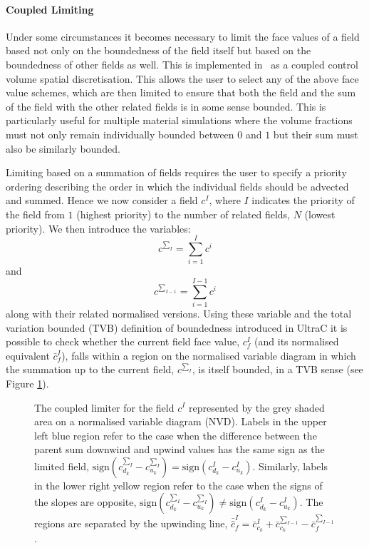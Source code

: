 \paragraph{Coupled Limiting} \label{sec:coupledlimiter}

Under some circumstances it becomes necessary to limit the face values of a field based not only on the boundedness of the field itself but based on the boundedness of other fields as well.  This is implemented in \fluidity\ as a coupled control volume spatial discretisation.  This allows the user to select any of the above face value schemes, which are then limited to ensure that both the field and the sum of the field with the other related fields is in some sense bounded.  This is particularly useful for multiple material simulations where the volume fractions must not only remain individually bounded between $0$ and $1$ but their sum must also be similarly bounded.

Limiting based on a summation of fields requires the user to specify a priority ordering describing the order in which the individual fields should be advected and summed.  Hence we now consider a field $c^I$, where $I$ indicates the priority of the field from $1$ (highest priority) to the number of related fields, $N$ (lowest priority).  We then introduce the variables:
\begin{equation}
c^{\sum_{I}} = \sum_{i=1}^I c^i
\end{equation}
and
\begin{equation}
c^{\sum_{I-1}} = \sum_{i=1}^{I-1} c^i
\end{equation}
along with their related normalised versions.  Using these variable and the total variation bounded (TVB) definition of boundedness introduced in UltraC it is possible to check whether the current field face value, $c_{f}^I$ (and its normalised equivalent $\bar{c}_{f}^I$), falls within a region on the normalised variable diagram in which the summation up to the current field, $c^{\sum_{I}}$, is itself bounded, in a TVB sense (see Figure \ref{fig:coupledlimiter}).

\begin{figure}[tbp]
\begin{center}
\caption{The coupled limiter for the field $c^I$ represented by the grey shaded area on a normalised variable diagram (NVD).  Labels in the upper left blue region refer to the case when the difference between the parent sum downwind and upwind values has the same sign as the limited field, $\text{sign}\left(c^{\sum_{I}}_{d_k}-c^{\sum_{I}}_{u_k}\right) = \text{sign}\left(c^{I}_{d_k}-c^{I}_{u_k}\right)$.  Similarly, labels in the lower right yellow region refer to the case when the signs of the slopes are opposite, $\text{sign}\left(c^{\sum_{I}}_{d_k}-c^{\sum_{I}}_{u_k}\right) \neq \text{sign}\left(c^{I}_{d_k}-c^{I}_{u_k}\right)$. The regions are separated by the upwinding line, $\bar{\hat{c}}^{I}_{f} = \bar{c}^{I}_{c_k} + \bar{c}^{\sum_{I-1}}_{c_k} - \bar{c}^{\sum_{I-1}}_{f}$.}
\label{fig:coupledlimiter}
\end{center}
\end{figure}

